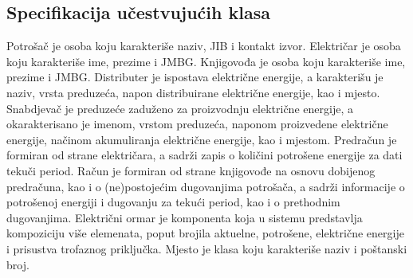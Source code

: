 \documentclass{article}
\begin{document}
\subsection{Specifikacija učestvujućih klasa}
Potrošač je osoba koju karakteriše naziv, JIB i kontakt izvor. 
Električar je osoba koju karakteriše ime, prezime i JMBG.
Knjigovođa je osoba koju karakteriše ime, prezime i JMBG.
Distributer je ispostava električne energije, a karakterišu je naziv, vrsta preduzeća, napon distribuirane električne energije, kao i mjesto. 
Snabdjevač je preduzeće zaduženo za proizvodnju električne energije, a okarakterisano je imenom, vrstom preduzeća, naponom proizvedene električne energije, načinom akumuliranja električne energije, kao i mjestom.
Predračun je formiran od strane električara, a sadrži zapis o količini potrošene energije za dati tekuči period.
Račun je formiran od strane knjigovođe na osnovu dobijenog predračuna, kao i o (ne)postojećim dugovanjima potrošača, a sadrži informacije o potrošenoj energiji i dugovanju za tekući period, kao i o prethodnim dugovanjima. 
Električni ormar je komponenta koja u sistemu predstavlja kompoziciju više elemenata, poput brojila aktuelne, potrošene, električne energije i prisustva trofaznog priključka. 
Mjesto je klasa koju karakteriše naziv i poštanski broj.
\end{document}
